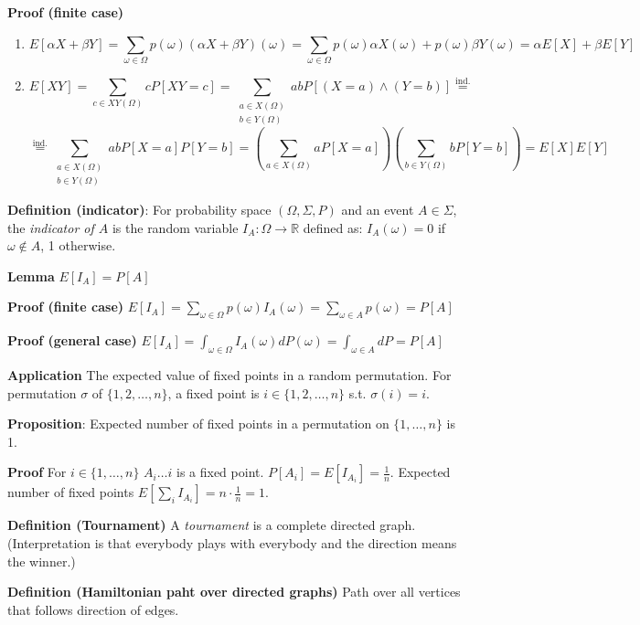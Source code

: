 \documentclass[a4paper]{article}
\begin{document}
\textbf{Proof (finite case)}
\begin{enumerate}[label=(\roman*)]
	\item $$E[\alpha{}X + \beta{}Y] = \sum_{\omega \in \Omega} p(\omega) (\alpha{}X + \beta{}Y)(\omega) = \sum_{\omega \in \Omega} p(\omega) \alpha{}X(\omega) + p(\omega)\beta{}Y(\omega) = \alpha{}E[X] + \beta{}E[Y]$$
	\item $$E[XY] = \sum_{c \in XY(\Omega)} c P[XY = c] = \sum_{\substack{a \in X(\Omega) \\ b \in Y(\Omega)}} abP[(X=a) \land (Y=b)] \stackrel{\mathrm{ind.}}{=}$$
		$$\stackrel{\mathrm{ind.}}{=} \sum_{\substack{a \in X(\Omega) \\ b \in Y(\Omega)}} abP[X=a]P[Y=b] = \left(\sum_{a \in X(\Omega)} aP[X=a]\right) \left(\sum_{b \in Y(\Omega)} bP[Y=b]\right) = E[X]E[Y]$$
\end{enumerate}

\textbf{Definition (indicator)}:
For probability space $(\Omega, \Sigma, P)$ and an event $A \in \Sigma$, the \emph{indicator of $A$} is the random variable $I_A : \Omega \rightarrow \mathbb{R}$ defined as:
$I_A(\omega) = 0$ if $\omega \notin A$, 1 otherwise.

\textbf{Lemma}
$E[I_A] = P[A]$

\textbf{Proof (finite case)}
$E[I_A] = \sum_{\omega \in \Omega} p(\omega) I_A(\omega) = \sum_{\omega \in A} p(\omega) = P[A]$

\textbf{Proof (general case)}
$E[I_A] = \int_{\omega \in \Omega} I_A(\omega) dP(\omega) = \int_{\omega \in A} dP = P[A]$

\textbf{Application}
The expected value of fixed points in a random permutation. For permutation $\sigma$ of $\{1, 2, \ldots, n\}$, a fixed point is $i \in \{1, 2, \ldots, n\}$ s.t. $\sigma(i) = i$.

\textbf{Proposition}:
Expected number of fixed points in a permutation on $\{1, \ldots, n\}$ is 1.

\textbf{Proof}
For $i \in \{1, \ldots, n\}\,\,A_i \ldots i$ is a fixed point.
$P[A_i] = E[I_{A_i}] = \frac{1}{n}$.
Expected number of fixed points $E[\sum_i I_{A_i}] = n \cdot \frac{1}{n} = 1$.

\textbf{Definition (Tournament)}
A \emph{tournament} is a complete directed graph. (Interpretation is that everybody plays with everybody and the direction means the winner.)

\textbf{Definition (Hamiltonian paht over directed graphs)}
Path over all vertices that follows direction of edges.
\end{document}
